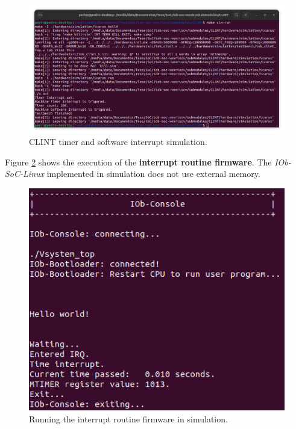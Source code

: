 \begin{figure}[!ht]
    \centering
    \includegraphics[width=\linewidth]{../images/clint_sim.png}
    \caption{CLINT timer and software interrupt simulation.}
    \label{fig:clint_sim}
\end{figure}

Figure \ref{fig:int_sim} shows the execution of the \textbf{interrupt routine firmware}. The \textit{IOb-SoC-Linux} implemented in simulation does not use external memory.

\begin{figure}[!ht]
    \centering
    \includegraphics[width=\linewidth]{../images/verilator_int_sim.png}
    \caption{Running the interrupt routine firmware in simulation.}
    \label{fig:int_sim}
\end{figure}

